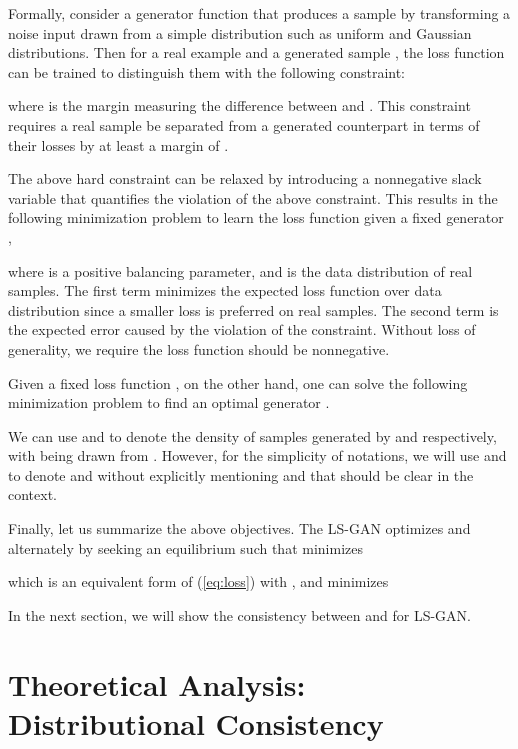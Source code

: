 \documentclass[11pt,fullpage, letterpaper,twoside]{article}
\newcommand{\1}[1]{\mathds{1}_{\left[#1\right]}}
\begin{document}
Formally, consider a generator function  that produces a sample   by transforming a noise input  drawn from a simple distribution  such as uniform and Gaussian distributions.
Then for
a real example  and a generated sample , the loss function can be trained to distinguish them with the following constraint:

where  is the margin measuring the difference between  and . This constraint requires a real sample be separated from a generated counterpart in terms of their losses by at least a margin of .

The above hard constraint can be relaxed by introducing a nonnegative slack variable 
that quantifies the violation of the above constraint. This results in the following minimization problem to learn the loss function  given a fixed generator ,

where  is a positive balancing parameter, and  is the data distribution of real samples.  The first term minimizes the expected loss function over data distribution since a smaller loss is preferred on real samples. The second term is the expected error caused by the violation of the constraint. Without loss of generality, we require the loss function should be nonnegative.






Given a fixed loss function , on the other hand, one can solve the following minimization problem to find an optimal generator .


We can use  and  to denote the density of samples generated by  and  respectively, with  being drawn from . However, for the simplicity of notations, we will use  and  to denote  and  without explicitly mentioning  and  that should be clear in the context.










Finally, let us summarize the above objectives. The LS-GAN optimizes  and  alternately by seeking an equilibrium  such that  minimizes

which is an equivalent form of (\ref{eq:loss}) with , and  minimizes

In the next section, we will show the consistency between  and  for LS-GAN.








\section{Theoretical Analysis: Distributional Consistency}\label{sec:theory}
\end{document}
